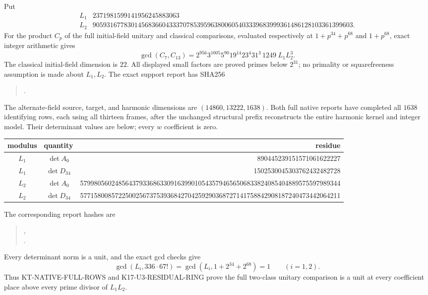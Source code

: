 Put
\[
\begin{array}{c|r}
 L_1&2371981599141956245883063\\
 L_2&905931677830145683660433370785395963800605403339683999361486128103361399603.
\end{array}                                                    \tag{KL.1}
\]
For the product $C_p$ of the full initial-field unitary and
classical comparisons, evaluated respectively at
$1+p^{34}+p^{68}$ and $1+p^{68}$, exact integer arithmetic gives
\[
 \gcd(C_7,C_{13})
       =2^{956}3^{1005}5^{90}19^{14}23^4 31^3\,1249
                                                    \;L_1L_2^3.
                                                               \tag{KL.2}
\]
The classical initial-field dimension is $22$.  All displayed
small factors are proved primes below $2^{31}$; no primality
or squarefreeness assumption is made about $L_1,L_2$.
The exact support report has SHA256
\begin{quote}\small
{}.
\end{quote}

The alternate-field source, target, and harmonic dimensions
are $(14860,13222,1638)$.  Both full native reports have
completed all $1638$ identifying rows, each using all thirteen
frames, after the unchanged structural prefix reconstructs
the entire harmonic kernel and integer model.  Their
determinant values are below; every $w$ coefficient is zero.
\begin{center}\footnotesize
\begin{tabular}{c|c|r}
modulus&quantity&residue\\\hline
$L_1$&$\det A_0$&890445239151571061622227\\
$L_1$&$\det D_{34}$&1502530045303762432482728\\
$L_2$&$\det A_0$&579980560248564379336863309163990105435794656506833824085404889575597989344\\
$L_2$&$\det D_{34}$&577158008572250025673753936842704259290368727141758842908187240473442064211
\end{tabular}
\end{center}
The corresponding report hashes are
\begin{quote}\small
{},\\
.
\end{quote}
Every determinant norm is a unit, and the exact gcd checks give
\[
 \gcd(L_i,336\cdot67!)=
 \gcd(L_i,1+2^{34}+2^{68})=1\qquad(i=1,2).                  \tag{KL.3}
\]
Thus KT-NATIVE-FULL-ROWS and K17-U3-RESIDUAL-RING prove
the full two-class unitary comparison is a unit at every
coefficient place above every prime divisor of $L_1L_2$.

